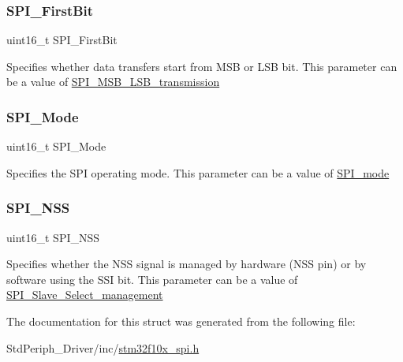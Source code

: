 \subsubsection{\texorpdfstring{SPI\_FirstBit}{SPI\_FirstBit}}
{\footnotesize\ttfamily uint16\+\_\+t S\+P\+I\+\_\+\+First\+Bit}

Specifies whether data transfers start from M\+SB or L\+SB bit. This parameter can be a value of \mbox{\hyperlink{group___s_p_i___m_s_b___l_s_b__transmission}{S\+P\+I\+\_\+\+M\+S\+B\+\_\+\+L\+S\+B\+\_\+transmission}} \mbox{\label{struct_s_p_i___init_type_def_aeddd33e224d56672843782c105ed82e4}} 
\subsubsection{\texorpdfstring{SPI\_Mode}{SPI\_Mode}}
{\footnotesize\ttfamily uint16\+\_\+t S\+P\+I\+\_\+\+Mode}

Specifies the S\+PI operating mode. This parameter can be a value of \mbox{\hyperlink{group___s_p_i__mode}{S\+P\+I\+\_\+mode}} \mbox{\label{struct_s_p_i___init_type_def_a046014c02b6456fd153ea81077e42ab6}} 
\subsubsection{\texorpdfstring{SPI\_NSS}{SPI\_NSS}}
{\footnotesize\ttfamily uint16\+\_\+t S\+P\+I\+\_\+\+N\+SS}

Specifies whether the N\+SS signal is managed by hardware (N\+SS pin) or by software using the S\+SI bit. This parameter can be a value of \mbox{\hyperlink{group___s_p_i___slave___select__management}{S\+P\+I\+\_\+\+Slave\+\_\+\+Select\+\_\+management}} 

The documentation for this struct was generated from the following file\+:\begin{DoxyCompactItemize}
\item 
Std\+Periph\+\_\+\+Driver/inc/\mbox{\hyperlink{stm32f10x__spi_8h}{stm32f10x\+\_\+spi.\+h}}\end{DoxyCompactItemize}
